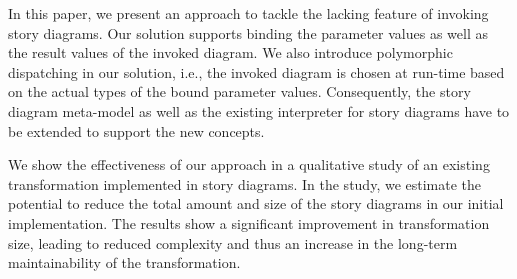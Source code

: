 In this paper, we present an approach to tackle the lacking feature of invoking story diagrams.
Our solution supports binding the parameter values as well as the result values of the invoked diagram.
We also introduce polymorphic dispatching in our solution, i.e., the invoked diagram is chosen at run-time based on the actual types of the bound parameter values.
Consequently, the story diagram meta-model as well as the existing interpreter for story diagrams \cite{GHS09} have to be extended to support the new concepts. 

We show the effectiveness of our approach in a qualitative study of an existing transformation implemented in story diagrams. In the study, we estimate the potential to reduce the total amount and size of the story diagrams in our initial implementation. The results show a significant improvement in transformation size, leading to reduced complexity and thus an increase in the long-term maintainability of the transformation.

